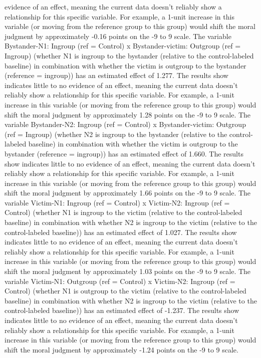 \documentclass[11pt]{article}
\begin{document}
evidence of an effect, meaning the current data doesn't reliably show a relationship for this specific variable. For example, a 1-unit increase in this variable (or moving from the reference group to this group) would shift the moral judgment by approximately -0.16 points on the -9 to 9 scale. The variable Bystander-N1: Ingroup (ref = Control) x Bystander-victim: Outgroup (ref = Ingroup) (whether N1 is ingroup to the bystander (relative to the control-labeled baseline) in combination with whether the victim is outgroup to the bystander (reference = ingroup)) has an estimated effect of 1.277. The results show indicates little to no evidence of an effect, meaning the current data doesn't reliably show a relationship for this specific variable. For example, a 1-unit increase in this variable (or moving from the reference group to this group) would shift the moral judgment by approximately 1.28 points on the -9 to 9 scale. The variable Bystander-N2: Ingroup (ref = Control) x Bystander-victim: Outgroup (ref = Ingroup) (whether N2 is ingroup to the bystander (relative to the control-labeled baseline) in combination with whether the victim is outgroup to the bystander (reference = ingroup)) has an estimated effect of 1.660. The results show indicates little to no evidence of an effect, meaning the current data doesn't reliably show a relationship for this specific variable. For example, a 1-unit increase in this variable (or moving from the reference group to this group) would shift the moral judgment by approximately 1.66 points on the -9 to 9 scale. The variable Victim-N1: Ingroup (ref = Control) x Victim-N2: Ingroup (ref = Control) (whether N1 is ingroup to the victim (relative to the control-labeled baseline) in combination with whether N2 is ingroup to the victim (relative to the control-labeled baseline)) has an estimated effect of 1.027. The results show indicates little to no evidence of an effect, meaning the current data doesn't reliably show a relationship for this specific variable. For example, a 1-unit increase in this variable (or moving from the reference group to this group) would shift the moral judgment by approximately 1.03 points on the -9 to 9 scale. The variable Victim-N1: Outgroup (ref = Control) x Victim-N2: Ingroup (ref = Control) (whether N1 is outgroup to the victim (relative to the control-labeled baseline) in combination with whether N2 is ingroup to the victim (relative to the control-labeled baseline)) has an estimated effect of -1.237. The results show indicates little to no evidence of an effect, meaning the current data doesn't reliably show a relationship for this specific variable. For example, a 1-unit increase in this variable (or moving from the reference group to this group) would shift the moral judgment by approximately -1.24 points on the -9 to 9 scale.
\end{document}

